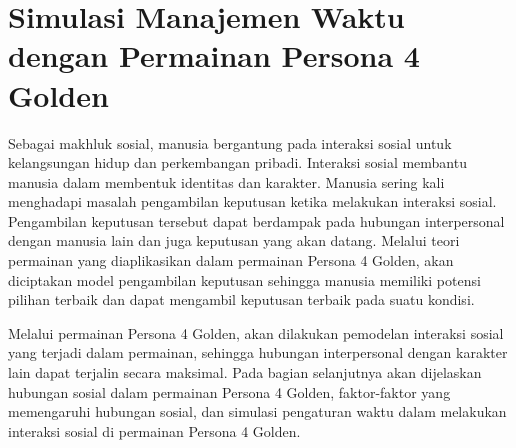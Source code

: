 \chapter{Simulasi Manajemen Waktu dengan Permainan Persona 4 Golden}
Sebagai makhluk sosial, manusia bergantung pada interaksi sosial untuk kelangsungan hidup dan perkembangan pribadi. Interaksi sosial membantu manusia dalam membentuk identitas dan karakter. Manusia sering kali menghadapi masalah pengambilan keputusan ketika melakukan interaksi sosial. Pengambilan keputusan tersebut dapat berdampak pada hubungan interpersonal dengan manusia lain dan juga keputusan yang akan datang. Melalui teori permainan yang diaplikasikan dalam permainan Persona 4 Golden, akan diciptakan model pengambilan keputusan sehingga manusia memiliki potensi pilihan terbaik dan dapat mengambil keputusan terbaik pada suatu kondisi.

Melalui permainan Persona 4 Golden, akan dilakukan pemodelan interaksi sosial yang terjadi dalam permainan, sehingga hubungan interpersonal dengan karakter lain dapat terjalin secara maksimal. Pada bagian selanjutnya akan dijelaskan hubungan sosial dalam permainan Persona 4 Golden, faktor-faktor yang memengaruhi hubungan sosial, dan simulasi pengaturan waktu dalam melakukan interaksi sosial di permainan Persona 4 Golden.

